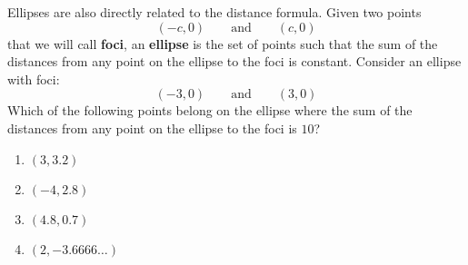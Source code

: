 \documentclass[nooutcomes,noauthor,handout]{../ximera}
\begin{document}
\begin{question}
  Ellipses are also directly related to the distance formula.  Given
  two points
  \[
  (-c,0) \qquad\text{and} \qquad (c,0)
  \]
  that we will call \textbf{foci}, an \textbf{ellipse} is the set
  of points such that the sum of the distances from any point on
  the ellipse to the foci is constant.
 Consider an ellipse with foci:
    \[
    (-3,0) \qquad \text{and}\qquad (3,0)
    \]%
    Which of the following points belong on the ellipse where the sum
    of the distances from any point on the ellipse to the foci is
    $10$?
    \begin{enumerate}
    \item $(3,3.2)$ %
    \item $(-4,2.8)$ %
    \item $(4.8,0.7)$ %
    \item $(2,-3.6666\dots)$ %
    \end{enumerate}
   \end{question}
\mynewpage
\end{document}
